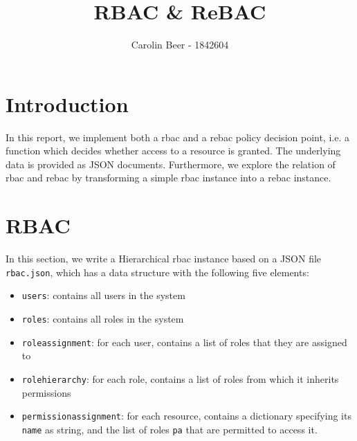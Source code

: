 \documentclass{semdoc}
\begin{document}

%
\title{RBAC \& ReBAC}
%
\author{Carolin Beer - 1842604}



%
\maketitle

\section{Introduction}
In this report, we implement both a \gls{rbac} and a \gls{rebac} policy decision point, i.e. a function which decides whether access to a resource is granted. The underlying data is provided as JSON documents.
Furthermore, we explore the relation of \gls{rbac} and \gls{rebac} by transforming a simple \gls{rbac} instance into a \gls{rebac} instance. 

\section{RBAC}

In this section, we write a Hierarchical \gls{rbac} instance based on a JSON file \texttt{rbac.json}, which has a data structure with the following five elements:
\begin{itemize}
  \item \texttt{users}: contains all users in the system
  \item \texttt{roles}: contains all roles in the system
  \item \texttt{roleassignment}: for each user, contains a list of roles that they are assigned to
  \item \texttt{rolehierarchy}: for each role, contains a list of roles from which it inherits permissions
  \item \texttt{permissionassignment}: for each resource, contains a dictionary specifying its \texttt{name} as string, and the list of roles \texttt{pa} that are permitted to access it.
\end{itemize}
\end{document}
